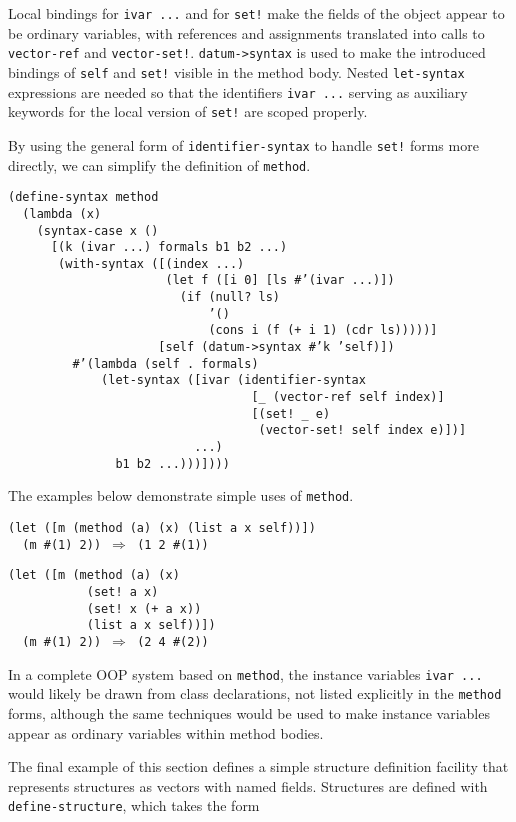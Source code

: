 Local bindings for \texttt{ivar ...} and for \texttt{set!} make the fields of
the object appear to be ordinary variables, with references and
assignments translated into calls to \texttt{vector-ref} and \texttt{vector-set!}.
\texttt{datum-\textgreater{}syntax} is used to make the introduced
bindings of \texttt{self} and \texttt{set!} visible in the method body.
Nested \texttt{let-syntax} expressions are needed so that the identifiers
\texttt{ivar ...} serving as auxiliary keywords for the local version of
\texttt{set!} are scoped properly.


\label{syntax_s68}By using the general form of \texttt{identifier-syntax} to handle \texttt{set!}
forms more directly, we can simplify the definition of \texttt{method}.


\begin{alltt}
(define-syntax method
  (lambda (x)
    (syntax-case x ()
      [(k (ivar ...) formals b1 b2 ...)
       (with-syntax ([(index ...)
                      (let f ([i 0] [ls \#{}'(ivar ...)])
                        (if (null? ls)
                            '()
                            (cons i (f (+ i 1) (cdr ls)))))]
                     [self (datum-\textgreater{}syntax \#{}'k 'self)])
         \#{}'(lambda (self . formals)
             (let-syntax ([ivar (identifier-syntax
                                  [\_{} (vector-ref self index)]
                                  [(set! \_{} e)
                                   (vector-set! self index e)])]
                          ...)
               b1 b2 ...)))])))
\end{alltt}


The examples below demonstrate simple uses of \texttt{method}.


\begin{alltt}
(let ([m (method (a) (x) (list a x self))])
  (m \#{}(1) 2)) \(\Rightarrow\) (1 2 \#{}(1))

(let ([m (method (a) (x)
           (set! a x)
           (set! x (+ a x))
           (list a x self))])
  (m \#{}(1) 2)) \(\Rightarrow\) (2 4 \#{}(2))
\end{alltt}


In a complete OOP system based on \texttt{method}, the instance variables
\texttt{ivar ...} would likely be drawn from class declarations, not
listed explicitly in the \texttt{method} forms, although the same techniques
would be used to make instance variables appear as ordinary variables
within method bodies.


\label{syntax_s69}The final example of this section defines a simple structure
definition facility that represents structures as vectors with
named fields.
Structures are defined with
\label{syntax_s70}\texttt{define-structure}, which takes the
form


